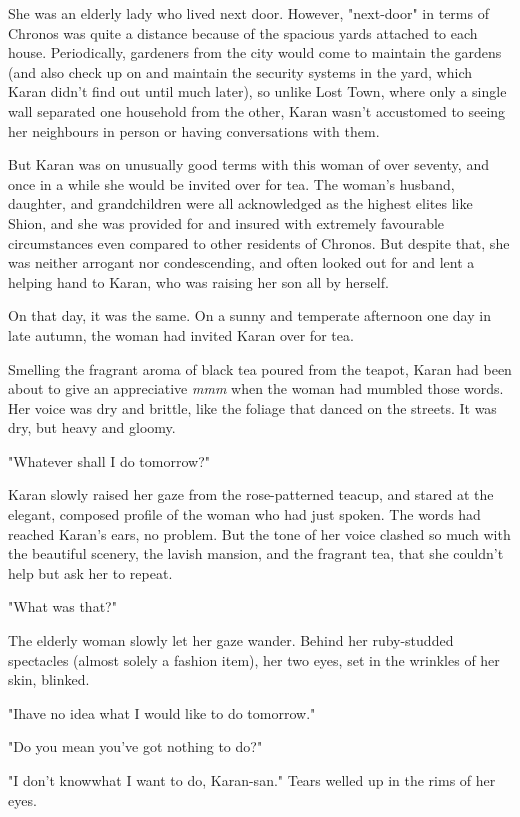 She was an elderly lady who lived next door. However, "next-door" in
terms of Chronos was quite a distance because of the spacious yards
attached to each house. Periodically, gardeners from the city would come
to maintain the gardens (and also check up on and maintain the security
systems in the yard, which Karan didn't find out until much later), so
unlike Lost Town, where only a single wall separated one household from
the other, Karan wasn't accustomed to seeing her neighbours in person or
having conversations with them.

But Karan was on unusually good terms with this woman of over seventy,
and once in a while she would be invited over for tea. The woman's
husband, daughter, and grandchildren were all acknowledged as the
highest elites like Shion, and she was provided for and insured with
extremely favourable circumstances even compared to other residents of
Chronos. But despite that, she was neither arrogant nor condescending,
and often looked out for and lent a helping hand to Karan, who was
raising her son all by herself.

On that day, it was the same. On a sunny and temperate afternoon one day
in late autumn, the woman had invited Karan over for tea.

Smelling the fragrant aroma of black tea poured from the teapot, Karan
had been about to give an appreciative \emph{mmm} when the woman had mumbled
those words. Her voice was dry and brittle, like the foliage that danced
on the streets. It was dry, but heavy and gloomy.

"Whatever shall I do tomorrow?"

Karan slowly raised her gaze from the rose-patterned teacup, and stared
at the elegant, composed profile of the woman who had just spoken. The
words had reached Karan's ears, no problem. But the tone of her voice
clashed so much with the beautiful scenery, the lavish mansion, and the
fragrant tea, that she couldn't help but ask her to repeat.

"What was that?"

The elderly woman slowly let her gaze wander. Behind her ruby-studded
spectacles (almost solely a fashion item), her two eyes, set in the
wrinkles of her skin, blinked.

"I\el have no idea what I would like to do tomorrow."

"Do you mean you've got nothing to do?"

"I don't know\el what I want to do, Karan-san." Tears welled up in the
rims of her eyes.

